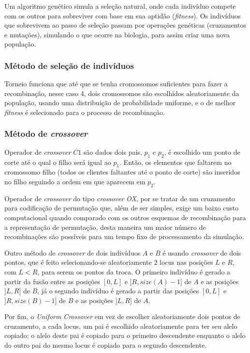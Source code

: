 \documentclass[12pt,a4paper]{article}
\begin{document}
Um algoritmo genético simula a seleção natural, onde cada indivíduo compete com os outros para sobreviver com base em sua aptidão (\emph{fitness}). Os indivíduos que sobrevivem ao passo de
seleção passam por operações genéticas (cruzamentos e mutações), simulando o que ocorre na biologia, para assim criar uma nova população.

    \subsubsection{Método de seleção de indivíduos}

        Torneio funciona que até que se tenha cromossomos suficientes para fazer a recombinação, nesse caso 4, dois cromossomos são escolhidos aleatoriamente da população, usando uma distribuição de
        probabilidade uniforme, e o de melhor \textit{fitness} é selecionado para o processo de recombinação.

    \subsubsection{Método de \textit{crossover}}

        Operador de \textit{crossover} $C1$ são dados dois pais, $p_1$ e $p_2$, é escolhido um ponto de corte até o qual o filho será igual ao $p_1$. Então, os elementos que faltarem no
        cromossomo filho (todos os clientes faltantes até o ponto de corte) são inseridos no filho seguindo a ordem em que aparecem em $p_2$. 

        Operador de \textit{crossover} do tipo \emph{crossover OX}, por se tratar de um cruzamento para codificação de permutação que, além de ser simples, exige um baixo custo computacional
        quando comparado com os outros esquemas de recombinação para a representação de permutação, desta maneira um maior número de recombinações são possíveis para um tempo fixo de processamento
        da simulação. 

        Outro método de \textit{crossover} de dois indivíduos $A$ e $B$ é usando \textit{crossover} de dois pontos, que é feito selecionando-se aleatoriamente $2$ locus nas posições $L$ e $R$,
        com $L < R$, para serem os pontos da troca.  O primeiro indivíduo é gerado a partir da fusão entre as posições $[0, L]$ e $]R, size(A) - 1]$ de $A$ e as posições $]L, R]$ de $B$, já
        o segundo indivíduo é gerado a partir das posições $[0, L]$ e $]R, size(B) - 1]$ de $B$ e as posições $]L, R]$ de $A$.

        Por fim, o \textit{Uniform Crossover} em vez de escolher aleatoriamente dois pontos de cruzamento, a cada locus, um pai é escolhido aleatoriamente para ter seu alelo copiado; o alelo
        deste pai é copiado para o primeiro descendente enquanto o alelo do outro pai do mesmo locus é copiado para o segundo descendente.
\end{document}
